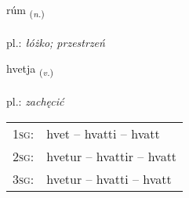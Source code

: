 \documentclass[frontgrid, backgrid]{flacards}\usepackage[]{graphicx}\usepackage[]{xcolor}
\begin{document}
\renewcommand{\blhead}{\vskip5pt {\small\bfseries\footnotesize Nafnorð | Noun }}
\renewcommand{\bcfoot}{\vskip5pt \hspace{2pt}{\small\bfseries\footnotesize 1K}}


{rúm \small{\textsubscript{(\textit{n.})}} \\[1ex] %
\textphonetic{[ruːm]} \\
pl.: \emph{łóżko; przestrzeń} \\  [2ex]
\renewcommand*{\arraystretch}{0.8}
}

\renewcommand{\flhead}{\vskip5pt \fboxsep=0pt {\small\bfseries\footnotesize Sagnorð | Verb}}
\renewcommand{\fcfoot}{\vskip5pt \fboxsep=0pt \hspace{2pt}{\small\bfseries\footnotesize 1K}}

\renewcommand{\blhead}{\vskip5pt {\small\bfseries\footnotesize Sagnorð | Verb }}
\renewcommand{\bcfoot}{\vskip5pt \hspace{2pt}{\small\bfseries\footnotesize 1K}}


{hvetja \small{\textsubscript{(\textit{v.})}} \\[1ex] %
\textphonetic{[kʰvɛːtja]} \\
pl.: \emph{zachęcić} \\  [2ex]
\renewcommand*{\arraystretch}{0.8}
\begin{tabular}{p{1cm}l}
\textsc{1sg}: & hvet -- hvatti -- hvatt \\ 
\textsc{2sg}: & hvetur -- hvattir -- hvatt \\ 
\textsc{3sg}: & hvetur -- hvatti -- hvatt \\ 
\end{tabular}
}

\renewcommand{\flhead}{\vskip5pt \fboxsep=0pt {\small\bfseries\footnotesize Sagnorð | Verb}}
\renewcommand{\fcfoot}{\vskip5pt \fboxsep=0pt \hspace{2pt}{\small\bfseries\footnotesize 1K}}
\end{document}
